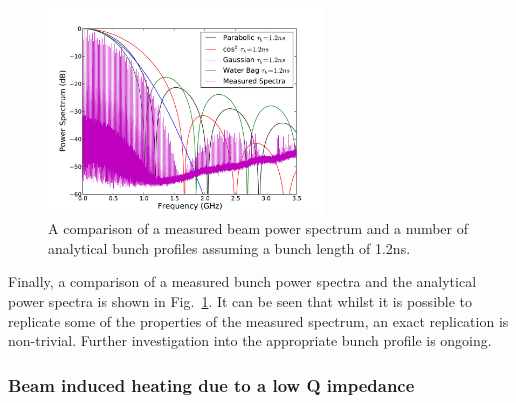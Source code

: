 \begin{figure}
\begin{center}
\includegraphics[width=0.65\textwidth]{Wakefields_and_Impedances/figures/beam_spectra_power_12ns.pdf}
\end{center}
\caption{A comparison of a measured beam power spectrum and a number of analytical bunch profiles assuming a bunch length of 1.2ns.}
\label{fig:power_all}
\end{figure}

Finally, a comparison of a measured bunch power spectra and the analytical power spectra is shown in Fig.~\ref{fig:power_all}. It can be seen that whilst it is possible to replicate some of the properties of the measured spectrum, an exact replication is non-trivial. Further investigation into the appropriate bunch profile is ongoing.




\subsubsection{Beam induced heating due to a low Q impedance}

